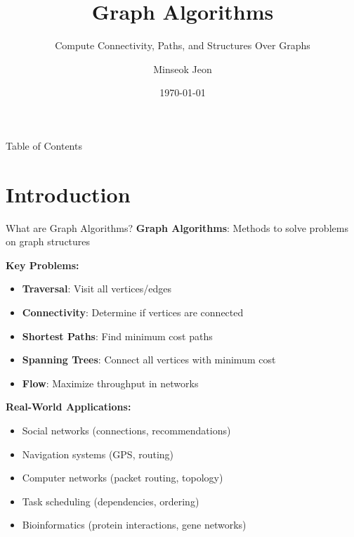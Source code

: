 \documentclass[aspectratio=169]{beamer}
\title{Graph Algorithms}
\subtitle{Compute Connectivity, Paths, and Structures Over Graphs}
\author{Minseok Jeon}
\institute{DGIST}
\date{\today}
\begin{document}
\begin{frame}
  \titlepage
\end{frame}

\begin{frame}{Table of Contents}
  \tableofcontents
\end{frame}

\section{Introduction}

\begin{frame}{What are Graph Algorithms?}
  \textbf{Graph Algorithms}: Methods to solve problems on graph structures

  \vspace{0.3cm}
  \textbf{Key Problems:}
  \begin{itemize}
    \item \textbf{Traversal}: Visit all vertices/edges
    \item \textbf{Connectivity}: Determine if vertices are connected
    \item \textbf{Shortest Paths}: Find minimum cost paths
    \item \textbf{Spanning Trees}: Connect all vertices with minimum cost
    \item \textbf{Flow}: Maximize throughput in networks
  \end{itemize}

  \vspace{0.3cm}
  \textbf{Real-World Applications:}
  \begin{itemize}
    \item Social networks (connections, recommendations)
    \item Navigation systems (GPS, routing)
    \item Computer networks (packet routing, topology)
    \item Task scheduling (dependencies, ordering)
    \item Bioinformatics (protein interactions, gene networks)
  \end{itemize}
\end{frame}
\end{document}
